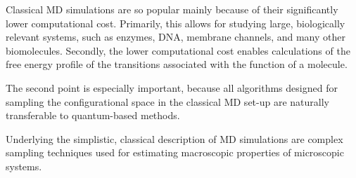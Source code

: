 Classical MD simulations are so popular mainly because of their significantly lower computational cost.
Primarily, this allows for studying large, biologically relevant systems, such as enzymes, DNA, membrane channels, and many other biomolecules.
Secondly, the lower computational cost enables calculations of the free energy profile of the transitions associated with the function of a molecule.


The second point is especially important, because all algorithms designed for sampling the configurational space in the classical MD set-up are naturally transferable to quantum-based methods.

Underlying the simplistic, classical description of MD simulations are complex sampling techniques used for estimating macroscopic properties of microscopic systems.
